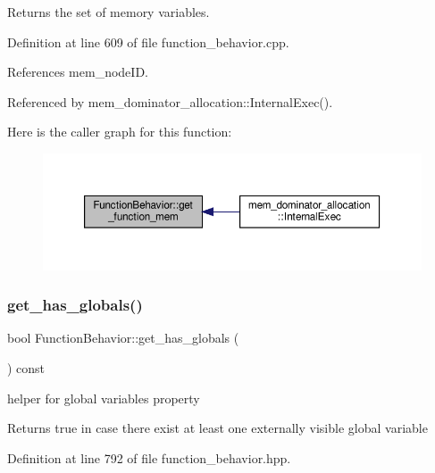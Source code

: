 Returns the set of memory variables. 



Definition at line 609 of file function\+\_\+behavior.\+cpp.



References mem\+\_\+node\+ID.



Referenced by mem\+\_\+dominator\+\_\+allocation\+::\+Internal\+Exec().

Here is the caller graph for this function\+:
\nopagebreak
\begin{figure}[H]
\begin{center}
\leavevmode
\includegraphics[width=350pt]{d9/d45/classFunctionBehavior_a8fc387658e865ef562a851f0d4e95b98_icgraph}
\end{center}
\end{figure}
\mbox{\label{classFunctionBehavior_a76ce9c2966c256c2a0fb4930a7dd2f4a}} 
\subsubsection{\texorpdfstring{get\+\_\+has\+\_\+globals()}{get\_has\_globals()}}
{\footnotesize\ttfamily bool Function\+Behavior\+::get\+\_\+has\+\_\+globals (\begin{DoxyParamCaption}{ }\end{DoxyParamCaption}) const\hspace{0.3cm}{\ttfamily [inline]}}



helper for global variables property 

\begin{DoxyReturn}{Returns}
true in case there exist at least one externally visible global variable 
\end{DoxyReturn}


Definition at line 792 of file function\+\_\+behavior.\+hpp.



